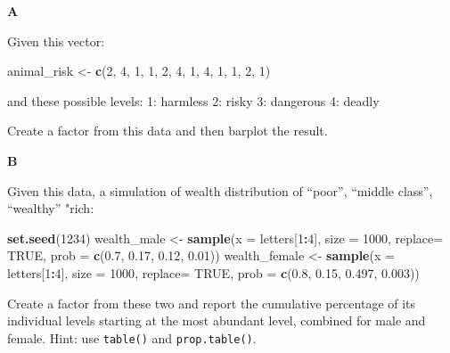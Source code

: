 \documentclass[]{book}
\newenvironment{Shaded}{\begin{snugshade}}{\end{snugshade}}
\newcommand{\DataTypeTok}[1]{\textcolor[rgb]{0.13,0.29,0.53}{#1}}
\newcommand{\DecValTok}[1]{\textcolor[rgb]{0.00,0.00,0.81}{#1}}
\newcommand{\FloatTok}[1]{\textcolor[rgb]{0.00,0.00,0.81}{#1}}
\newcommand{\KeywordTok}[1]{\textcolor[rgb]{0.13,0.29,0.53}{\textbf{#1}}}
\newcommand{\NormalTok}[1]{#1}
\newcommand{\OperatorTok}[1]{\textcolor[rgb]{0.81,0.36,0.00}{\textbf{#1}}}
\newcommand{\OtherTok}[1]{\textcolor[rgb]{0.56,0.35,0.01}{#1}}
\newcommand{\StringTok}[1]{\textcolor[rgb]{0.31,0.60,0.02}{#1}}
\begin{document}
\textbf{A}

Given this vector:

\begin{Shaded}
\begin{Highlighting}[]
\NormalTok{animal_risk <-}\StringTok{ }\KeywordTok{c}\NormalTok{(}\DecValTok{2}\NormalTok{, }\DecValTok{4}\NormalTok{, }\DecValTok{1}\NormalTok{, }\DecValTok{1}\NormalTok{, }\DecValTok{2}\NormalTok{, }\DecValTok{4}\NormalTok{, }\DecValTok{1}\NormalTok{, }\DecValTok{4}\NormalTok{, }\DecValTok{1}\NormalTok{, }\DecValTok{1}\NormalTok{, }\DecValTok{2}\NormalTok{, }\DecValTok{1}\NormalTok{)}
\end{Highlighting}
\end{Shaded}

and these possible levels:
1: harmless
2: risky
3: dangerous
4: deadly

Create a factor from this data and then barplot the result.

\textbf{B}

Given this data, a simulation of wealth distribution of ``poor'', ``middle class'', ``wealthy'' "rich:

\begin{Shaded}
\begin{Highlighting}[]
\KeywordTok{set.seed}\NormalTok{(}\DecValTok{1234}\NormalTok{)}
\NormalTok{wealth_male <-}\StringTok{ }\KeywordTok{sample}\NormalTok{(}\DataTypeTok{x =}\NormalTok{ letters[}\DecValTok{1}\OperatorTok{:}\DecValTok{4}\NormalTok{], }
                 \DataTypeTok{size =} \DecValTok{1000}\NormalTok{,}
                 \DataTypeTok{replace=} \OtherTok{TRUE}\NormalTok{, }
                 \DataTypeTok{prob =} \KeywordTok{c}\NormalTok{(}\FloatTok{0.7}\NormalTok{, }\FloatTok{0.17}\NormalTok{, }\FloatTok{0.12}\NormalTok{, }\FloatTok{0.01}\NormalTok{))}
\NormalTok{wealth_female <-}\StringTok{ }\KeywordTok{sample}\NormalTok{(}\DataTypeTok{x =}\NormalTok{ letters[}\DecValTok{1}\OperatorTok{:}\DecValTok{4}\NormalTok{], }
                 \DataTypeTok{size =} \DecValTok{1000}\NormalTok{,}
                 \DataTypeTok{replace=} \OtherTok{TRUE}\NormalTok{, }
                 \DataTypeTok{prob =} \KeywordTok{c}\NormalTok{(}\FloatTok{0.8}\NormalTok{, }\FloatTok{0.15}\NormalTok{, }\FloatTok{0.497}\NormalTok{, }\FloatTok{0.003}\NormalTok{))}
\end{Highlighting}
\end{Shaded}

Create a factor from these two and report the cumulative percentage of its individual levels starting at the most abundant level, combined for male and female. Hint: use \texttt{table()} and \texttt{prop.table()}.
\end{document}
